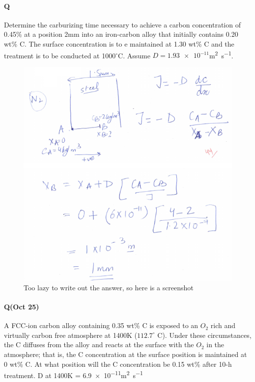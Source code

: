 \documentclass{article}
\begin{document}

\paragraph{Q} Determine the carburizing time necessary to achieve a carbon concentration of 0.45\% at a position 2mm into an iron-carbon alloy that initially contains 0.20 wt\% C. The surface concentration is to e maintained at 1.30 wt\% C and the treatment is to be conducted at 1000$^\circ$C. Assume $D = \num{1.93e-11}$\si{\metre\squared\per\second}.

\begin{figure}[h!]
	\centering
	\includegraphics[width=\textwidth]{assets/c547ceac.png}
	\caption{Too lazy to write out the answer, so here is a screenshot}
\end{figure}

\paragraph{Q(Oct 25)} A FCC-ion carbon alloy containing 0.35 wt\% C is exposed to an $O_2$ rich and virtually carbon free atmosphere at 1400K ($112.7^\circ$ C). Under these circumstances, the C diffuses from the alloy and reacts at the surface with the $O_2$ in the atmosphere; that is, the C concentration at the surface position is maintained at 0 wt\% C. At what position will the C concentration be 0.15 wt\% after 10-h treatment. D at 1400K = \num{6.9e-11}\si{\metre\squared\per\second}
\end{document}
